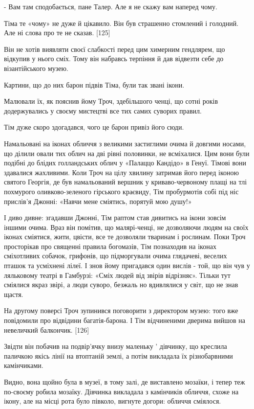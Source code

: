 - Вам там сподобається, пане Талер. Але я не скажу вам наперед чому.

Тіма те «чому» не дуже й цікавило. Він був страшенно стомлений і голодний. Але ні слова про те не сказав. [125]

Він не хотів виявляти своєї слабкості перед цим химерним гендлярем, що відкупив у нього сміх. Тому він набравсь терпіння й дав відвезти себе до візантійського музею.

Картини, що до них барон підвів Тіма, були так звані ікони.

Малювали їх, як пояснив йому Троч, здебільшого ченці, що сотні років додержувались у своєму мистецтві все тих самих суворих правил.

Тім дуже скоро здогадався, чого це барон привіз його сюди.

Намальовані на іконах обличчя з великими застиглими очима й довгими носами, що ділили овали тих облич на дві рівні половинки, не всміхалися. Цим вони були подібні до блідих голландських облич у «Палаццо Кандідо» в Генуї. Тімові вони здавалися жахливими. Коли Троч на цілу хвилину затримав його перед іконою святого Георгія, де був намальований вершник у криваво-червоному плащі на тлі похмурого оливково-зеленого гірського краєвиду, Тім пробурмотів собі під ніс прислів'я Джонні: «Навчи мене сміятись, порятуй мою душу!»

І диво дивне: згадавши Джонні, Тім раптом став дивитись на ікони зовсім іншими очима. Враз він помітив, що малярі-ченці, не дозволяючи людям на своїх іконах сміятися, жити, цвісти, все те дозволяли тваринам і рослинам. Поки Троч просторікав про священні правила богомазів, Тім познаходив на іконах сміхотливих собачок, грифонів, що підморгували очима глядачеві, веселих пташок та усміхнені лілеї. І знов йому пригадався один вислів - той, що він чув у ляльковому театрі в Гамбурзі: «Сміх людей від звірів відрізняє». Тільки тут сміялися якраз звірі, а люди суворо, безжаль но вдивлялися у світ, що не знав щастя.

На другому поверсі Троч зупинився поговорити з директором музею: того вже повідомили про відвідини багатія-барона. І Тім відчиненими дверима вийшов на невеличкий балкончик. [126]

Звідти він побачив на подвір'ячку внизу маленьку ' дівчинку, що креслила паличкою якісь лінії на втоптаній землі, а потім викладала їх різнобарвними камінчиками.

Видно, вона щойно була в музеї, в тому залі, де виставлено мозаїки, і тепер теж по-своєму робила мозаїку. Дівчинка викладала з камінчиків обличчя, схоже на ікону, але на місці рота було півколо, вигнуте догори: обличчя сміялося.

